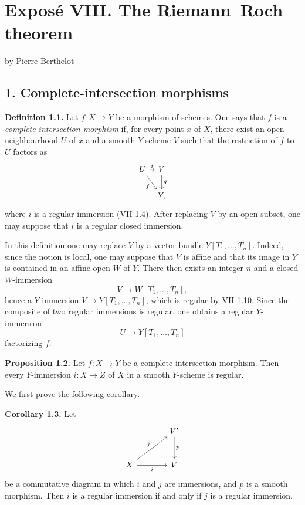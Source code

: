 \providecommand{\etale}{\'etale}
\providecommand{\Ch}{\operatorname{Ch}}


\section*{Expos\'e VIII. The Riemann--Roch theorem}
\begin{center}
by Pierre Berthelot
\end{center}

\subsection*{1. Complete-intersection morphisms}

\textbf{Definition 1.1.} Let $f:X\to Y$ be a morphism of schemes. One says that $f$ is a \emph{complete-intersection morphism} if, for every point $x$ of $X$, there exist an open neighbourhood $U$ of $x$ and a smooth $Y$-scheme $V$ such that the restriction of $f$ to $U$ factors as
\[
\begin{tikzcd}[column sep=tiny]
U \arrow[r,"i"] \arrow[dr,"f"'] & V \arrow[d,"g"]\\
& Y,
\end{tikzcd}
\]
where $i$ is a regular immersion (\hyperlink{sga6.e07.def.1-4}{VII 1.4}). After replacing $V$ by an open subset, one may suppose that $i$ is a regular closed immersion.

In this definition one may replace $V$ by a vector bundle $Y[T_1,\ldots,T_n]$. Indeed, since the notion is local, one may suppose that $V$ is affine and that its image in $Y$ is contained in an affine open $W$ of $Y$. There then exists an integer $n$ and a closed $W$-immersion
\[
V\longrightarrow W[T_1,\ldots,T_n],
\]
hence a $Y$-immersion $V\to Y[T_1,\ldots,T_n]$, which is regular by \hyperlink{sga6.e07.prop.1-10}{VII 1.10}. Since the composite of two regular immersions is regular, one obtains a regular $Y$-immersion
\[
U\longrightarrow Y[T_1,\ldots,T_n]
\]
factorizing $f$.

\textbf{Proposition 1.2.} Let $f:X\to Y$ be a complete-intersection morphism. Then every $Y$-immersion $i:X\to Z$ of $X$ in a smooth $Y$-scheme is regular.

We first prove the following corollary.

\textbf{Corollary 1.3.} Let
\[
\begin{tikzcd}[column sep=large,row sep=large]
& V' \arrow[d,"p"]\\
X \arrow[ur,"j"] \arrow[r,"i"'] & V
\end{tikzcd}
\]
be a commutative diagram in which $i$ and $j$ are immersions, and $p$ is a smooth morphism. Then $i$ is a regular immersion if and only if $j$ is a regular immersion.

